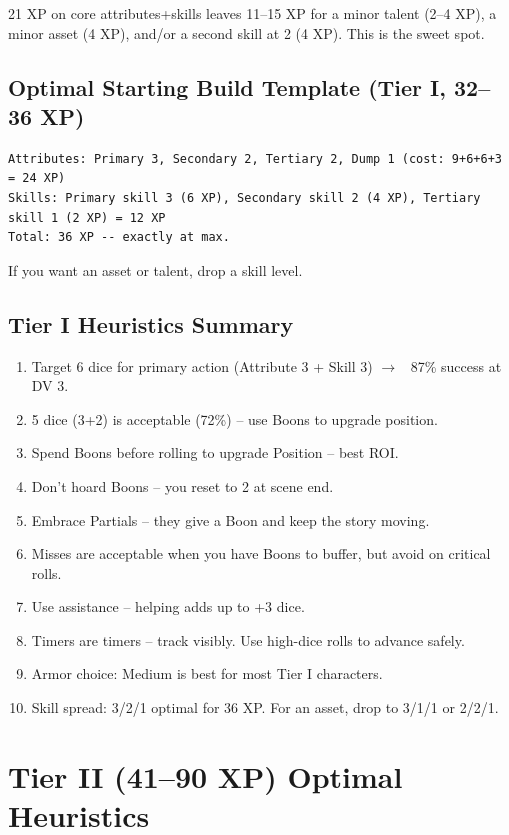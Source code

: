 \documentclass[11pt]{article}
\begin{document}
21 XP on core attributes+skills leaves 11--15 XP for a minor talent (2--4 XP), a minor asset (4 XP), and/or a second skill at 2 (4 XP). This is the sweet spot.

\subsection{Optimal Starting Build Template (Tier I, 32--36 XP)}
\begin{verbatim}
Attributes: Primary 3, Secondary 2, Tertiary 2, Dump 1 (cost: 9+6+6+3 = 24 XP)
Skills: Primary skill 3 (6 XP), Secondary skill 2 (4 XP), Tertiary skill 1 (2 XP) = 12 XP
Total: 36 XP -- exactly at max.
\end{verbatim}
If you want an asset or talent, drop a skill level.

\subsection{Tier I Heuristics Summary}
\begin{enumerate}
    \item Target 6 dice for primary action (Attribute 3 + Skill 3) $\rightarrow$ ~87\% success at DV 3.
    \item 5 dice (3+2) is acceptable (72\%) -- use Boons to upgrade position.
    \item Spend Boons before rolling to upgrade Position -- best ROI.
    \item Don't hoard Boons -- you reset to 2 at scene end.
    \item Embrace Partials -- they give a Boon and keep the story moving.
    \item Misses are acceptable when you have Boons to buffer, but avoid on critical rolls.
    \item Use assistance -- helping adds up to +3 dice.
    \item Timers are timers -- track visibly. Use high-dice rolls to advance safely.
    \item Armor choice: Medium is best for most Tier I characters.
    \item Skill spread: 3/2/1 optimal for 36 XP. For an asset, drop to 3/1/1 or 2/2/1.
\end{enumerate}

\section{Tier II (41--90 XP) Optimal Heuristics}
\end{document}
